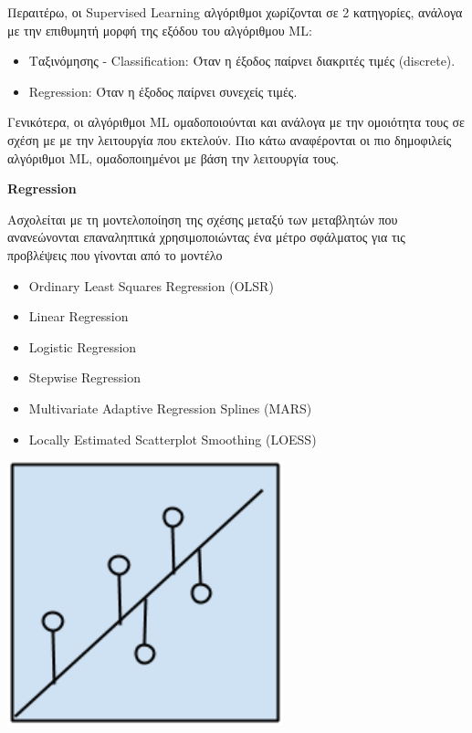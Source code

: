 Περαιτέρω, οι Supervised Learning αλγόριθμοι χωρίζονται σε 2 κατηγορίες, ανάλογα
με την επιθυμητή μορφή της εξόδου του αλγόριθμου ML:
\begin{itemize}
  \item{Ταξινόμησης - Classification: Όταν η έξοδος παίρνει διακριτές τιμές (discrete).}
  \item{Regression: Όταν η έξοδος παίρνει συνεχείς τιμές.}
\end{itemize}

Γενικότερα, οι αλγόριθμοι ML ομαδοποιούνται και ανάλογα με την ομοιότητα τους
σε σχέση με με την λειτουργία που εκτελούν. Πιο κάτω αναφέρονται οι πιο δημοφιλείς
αλγόριθμοι ML, ομαδοποιημένοι με βάση την λειτουργία τους.
\\

\begin{minipage}{0.5\textwidth}

  \textbf{\large Regression}

  Ασχολείται με τη μοντελοποίηση της σχέσης μεταξύ των μεταβλητών που ανανεώνονται επαναληπτικά
  χρησιμοποιώντας ένα μέτρο σφάλματος για τις προβλέψεις που γίνονται από το μοντέλο
  \begin{itemize}
    \setlength\itemsep{0em}
    \item{Ordinary Least Squares Regression (OLSR)}
    \item{Linear Regression}
    \item{Logistic Regression}
    \item{Stepwise Regression}
    \item{Multivariate Adaptive Regression Splines (MARS)}
    \item{Locally Estimated Scatterplot Smoothing (LOESS)}
  \end{itemize}
\end{minipage}
\begin{minipage}{0.5\textwidth}
  \begin{center}
    \includegraphics[width=0.6\textwidth]{./images/chapter3/regression_algorithms.png}
  \end{center}
\end{minipage}


